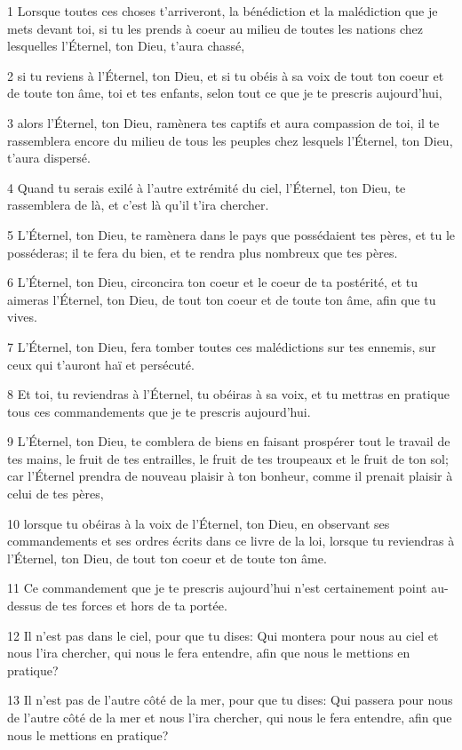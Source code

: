 \par 1 Lorsque toutes ces choses t'arriveront, la bénédiction et la malédiction que je mets devant toi, si tu les prends à coeur au milieu de toutes les nations chez lesquelles l'Éternel, ton Dieu, t'aura chassé,
\par 2 si tu reviens à l'Éternel, ton Dieu, et si tu obéis à sa voix de tout ton coeur et de toute ton âme, toi et tes enfants, selon tout ce que je te prescris aujourd'hui,
\par 3 alors l'Éternel, ton Dieu, ramènera tes captifs et aura compassion de toi, il te rassemblera encore du milieu de tous les peuples chez lesquels l'Éternel, ton Dieu, t'aura dispersé.
\par 4 Quand tu serais exilé à l'autre extrémité du ciel, l'Éternel, ton Dieu, te rassemblera de là, et c'est là qu'il t'ira chercher.
\par 5 L'Éternel, ton Dieu, te ramènera dans le pays que possédaient tes pères, et tu le posséderas; il te fera du bien, et te rendra plus nombreux que tes pères.
\par 6 L'Éternel, ton Dieu, circoncira ton coeur et le coeur de ta postérité, et tu aimeras l'Éternel, ton Dieu, de tout ton coeur et de toute ton âme, afin que tu vives.
\par 7 L'Éternel, ton Dieu, fera tomber toutes ces malédictions sur tes ennemis, sur ceux qui t'auront haï et persécuté.
\par 8 Et toi, tu reviendras à l'Éternel, tu obéiras à sa voix, et tu mettras en pratique tous ces commandements que je te prescris aujourd'hui.
\par 9 L'Éternel, ton Dieu, te comblera de biens en faisant prospérer tout le travail de tes mains, le fruit de tes entrailles, le fruit de tes troupeaux et le fruit de ton sol; car l'Éternel prendra de nouveau plaisir à ton bonheur, comme il prenait plaisir à celui de tes pères,
\par 10 lorsque tu obéiras à la voix de l'Éternel, ton Dieu, en observant ses commandements et ses ordres écrits dans ce livre de la loi, lorsque tu reviendras à l'Éternel, ton Dieu, de tout ton coeur et de toute ton âme.
\par 11 Ce commandement que je te prescris aujourd'hui n'est certainement point au-dessus de tes forces et hors de ta portée.
\par 12 Il n'est pas dans le ciel, pour que tu dises: Qui montera pour nous au ciel et nous l'ira chercher, qui nous le fera entendre, afin que nous le mettions en pratique?
\par 13 Il n'est pas de l'autre côté de la mer, pour que tu dises: Qui passera pour nous de l'autre côté de la mer et nous l'ira chercher, qui nous le fera entendre, afin que nous le mettions en pratique?
